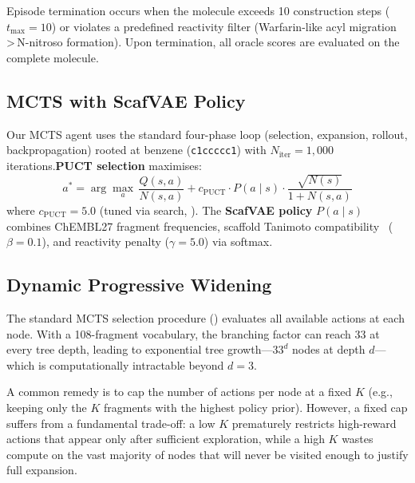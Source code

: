 \documentclass[jcim,article,layout=manuscript]{achemso}
\begin{document}
Episode termination occurs when the molecule exceeds 10 construction steps
($t_{\max}=10$) or violates a predefined reactivity filter (Warfarin-like
acyl migration\,>\,N-nitroso formation). Upon termination, all oracle
scores are evaluated on the complete molecule.

\subsection{MCTS with ScafVAE Policy}
\label{sec:mcts}

Our MCTS agent uses the standard four-phase loop (selection, expansion,
rollout, backpropagation) rooted at benzene (\texttt{c1ccccc1}) with
$N_{\text{iter}}=1{,}000$ iterations.\textbf{PUCT selection} maximises:
\begin{equation}
  a^{*} = \arg\max_{a} \,\frac{Q(s,a)}{N(s,a)} + c_{\text{PUCT}} \cdot P(a\mid s) \cdot \frac{\sqrt{N(s)}}{1 + N(s,a)}
  \label{eq:puct}
\end{equation}
where $c_{\text{PUCT}}=5.0$ (tuned via search, ). The
\textbf{ScafVAE policy} $P(a\mid s)$ combines ChEMBL27 fragment frequencies,
scaffold Tanimoto compatibility~\cite{Temgoua2026} ($\beta=0.1$), and
reactivity penalty ($\gamma=5.0$) via softmax.

\subsection{Dynamic Progressive Widening}
\label{sec:pw}

The standard MCTS selection procedure () evaluates all
available actions at each node. With a 108-fragment vocabulary, the
branching factor can reach 33 at every tree depth, leading to
exponential tree growth---$33^{d}$ nodes at depth $d$---which is
computationally intractable beyond $d=3$.

A common remedy is to cap the number of actions per node at a fixed
$K$ (e.g., keeping only the $K$ fragments with the highest policy
prior). However, a fixed cap suffers from a fundamental trade-off:
a low $K$ prematurely restricts high-reward actions that appear only
after sufficient exploration, while a high $K$ wastes compute on the
vast majority of nodes that will never be visited enough to justify
full expansion.
\end{document}
